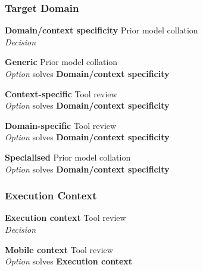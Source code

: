 \subsubsection{Target Domain}

\textbf{Domain/context specificity} \hfill Prior model collation \cite{Aghaee2012} \\ \emph{Decision} \hfill 


\textbf{Generic} \hfill Prior model collation \cite{Aghaee2012} \\ \emph{Option} \hfill solves \textbf{Domain/context specificity}


\textbf{Context-specific} \hfill Tool review \\ \emph{Option} \hfill solves \textbf{Domain/context specificity}

\textbf{Domain-specific} \hfill Tool review \\ \emph{Option} \hfill solves \textbf{Domain/context specificity}

\textbf{Specialised} \hfill Prior model collation \cite{Aghaee2012} \\ \emph{Option} \hfill solves \textbf{Domain/context specificity}


\subsubsection{Execution Context}

\textbf{Execution context} \hfill Tool review \\ \emph{Decision} \hfill 

\textbf{Mobile context} \hfill Tool review \\ \emph{Option} \hfill solves \textbf{Execution context}

